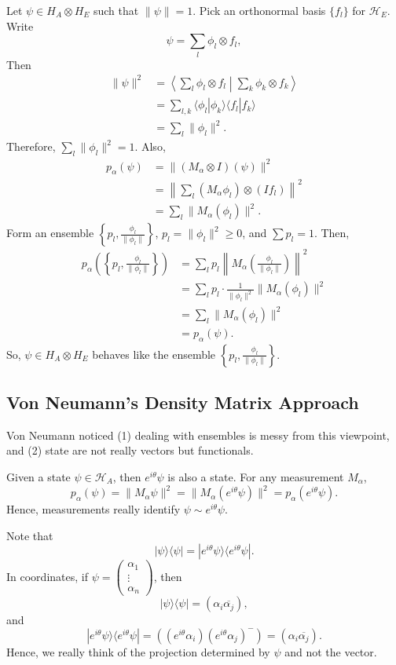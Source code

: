 \documentclass[12pt]{article}
\theoremstyle{definition}
\newcommand{\ketbra}[2]{|#1\rangle\langle #2|}
\begin{document}
Let $\psi \in H_A \otimes H_E$ such that $\|\psi\| = 1$. Pick an orthonormal basis $\{f_l\}$ for $\mathcal{H}_E$. Write
\[
\psi = \sum_l \phi_l \otimes f_l,
\]
Then
\begin{align*}
\|\psi\|^2 &= \left\langle \sum_l \phi_l \otimes f_l \middle| \sum_k \phi_k \otimes f_k \right\rangle \\
&= \sum_{l,k} \langle \phi_l|\phi_k\rangle \langle f_l|f_k\rangle \\
&= \sum_l \|\phi_l\|^2.
\end{align*}
Therefore, $\sum_l \|\phi_l\|^2 = 1$. Also,
\begin{align*}
p_\alpha(\psi) &= \|(M_\alpha \otimes I)(\psi)\|^2 \\
&= \left\|\sum_l (M_\alpha\phi_l) \otimes (If_l)\right\|^2 \\
&= \sum_l \|M_\alpha(\phi_l)\|^2.
\end{align*}
Form an ensemble $\left\{p_l, \frac{\phi_l}{\|\phi_l\|}\right\}$, $p_l = \|\phi_l\|^2 \geq 0$, and $\sum p_l = 1$. Then,
\begin{align*}
p_\alpha\left(\left\{p_l, \frac{\phi_l}{\|\phi_l\|}\right\}\right) &= \sum_l p_l \left\|M_\alpha\left(\frac{\phi_l}{\|\phi_l\|}\right)\right\|^2 \\
&= \sum_l p_l \cdot \frac{1}{\|\phi_l\|^2} \|M_\alpha(\phi_l)\|^2 \\
&= \sum_l \|M_\alpha(\phi_l)\|^2 \\
&= p_\alpha(\psi).
\end{align*}
So, $\psi \in H_A \otimes H_E$ behaves like the ensemble $\left\{p_l, \frac{\phi_l}{\|\phi_l\|}\right\}$.

\subsection{Von Neumann's Density Matrix Approach}

Von Neumann noticed (1) dealing with ensembles is messy from this viewpoint, and (2) state are not really vectors but functionals.

Given a state $\psi \in \mathcal{H}_A$, then $e^{i\theta}\psi$ is also a state. For any measurement $M_\alpha$,
\[
p_\alpha(\psi) = \|M_\alpha \psi\|^2 = \|M_\alpha(e^{i\theta}\psi)\|^2 = p_\alpha(e^{i\theta}\psi).
\]
Hence, measurements really identify $\psi \sim e^{i\theta}\psi$.

Note that
\[
\ketbra{\psi}{\psi} = \ketbra{e^{i\theta}\psi}{e^{i\theta}\psi}.
\]
In coordinates, if $\psi = \begin{pmatrix}\alpha_1\\\vdots\\\alpha_n\end{pmatrix}$, then
\[
\ketbra{\psi}{\psi} = (\alpha_i\overline{\alpha_j}),
\]
and
\[
\ketbra{e^{i\theta}\psi}{e^{i\theta}\psi} = ((e^{i\theta}\alpha_i)(e^{i\theta}\alpha_j)^-) = (\alpha_i\overline{\alpha_j}).
\]
Hence, we really think of the projection determined by $\psi$ and not the vector.
\end{document}

